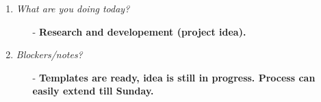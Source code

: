 \begin{enumerate}
\begin{enumerate}
\begin{enumerate}
    \end{enumerate}
    \item \textsl{What are you doing today?}
    \begin{enumerate}
      \item[-] \textbf{Research and developement (project idea).}
    \end{enumerate}
    \item \textsl{Blockers/notes?}
    \begin{enumerate}
      \item[-] \textbf{Templates are ready, idea is still in progress. Process can easily extend till Sunday.}
    \end{enumerate}
  \end{enumerate} 
\end{enumerate}